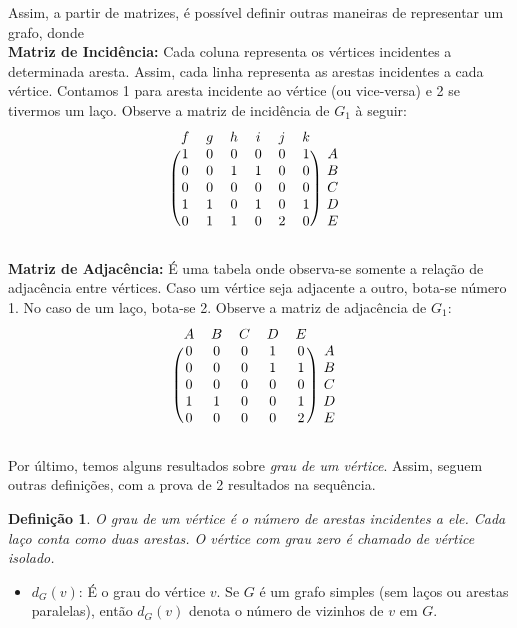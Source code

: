 \documentclass[a4paper,12pt]{article}
\newtheorem{definicao}{Definição}[section]
\begin{document}
Assim, a partir de matrizes, é possível definir outras maneiras de representar um grafo, donde
\\

\noindent\textbf{Matriz de Incidência: }Cada coluna representa os vértices incidentes a determinada aresta. Assim, cada linha representa as arestas incidentes a cada vértice. Contamos 1 para aresta incidente ao vértice (ou vice-versa) e 2 se tivermos um laço. Observe a matriz de incidência de $G_1$ à seguir:
\[
\begin{blockarray}{ccccccc}
f & g & h & i & j & k \\
\begin{block}{(cccccc)c}
1 & 0 & 0 & 0 & 0 & 1 & A \\
0 & 0 & 1 & 1 & 0 & 0 & B \\
0 & 0 & 0 & 0 & 0 & 0 & C \\
1 & 1 & 0 & 1 & 0 & 1 & D \\
0 & 1 & 1 & 0 & 2 & 0 & E \\
\end{block}
\end{blockarray}
\]

\noindent\textbf{Matriz de Adjacência: }É uma tabela onde observa-se somente a relação de adjacência entre vértices. Caso um vértice seja adjacente a outro, bota-se número 1. No caso de um laço, bota-se 2. Observe a matriz de adjacência de $G_1$:
\[
\begin{blockarray}{cccccc}
A & B & C & D & E\\
\begin{block}{(ccccc)c}
0 & 0 & 0 & 1 & 0 & A \\
0 & 0 & 0 & 1 & 1 & B \\
0 & 0 & 0 & 0 & 0 & C \\
1 & 1 & 0 & 0 & 1 & D \\
0 & 0 & 0 & 0 & 2 & E \\
\end{block}
\end{blockarray}
\]

Por último, temos alguns resultados sobre \textit{grau de um vértice}. Assim, seguem outras definições, com a prova de 2 resultados na sequência.

\begin{definicao}
	O \textit{grau} de um vértice é o número de arestas incidentes a ele. Cada laço conta como duas arestas. O vértice com \textit{grau} zero é chamado de \textit{vértice isolado}.
\end{definicao}
\begin{itemize}
	\item $d_{G}(v)$: É o grau do vértice $v$. Se $G$ é um grafo simples (sem laços ou arestas paralelas), então $d_{G}(v)$ denota o número de vizinhos de $v$ em $G$.
\end{itemize}
\end{document}
